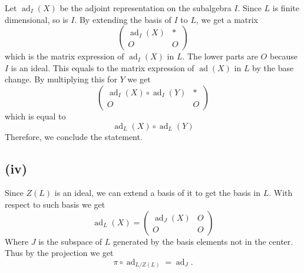 \documentclass{article}
\numberwithin{equation}{section}
\DeclareMathOperator{\ad}{ad}
\begin{document}
Let $\ad_I(X)$ be the adjoint representation on the subalgebra $I$. Since $L$ is finite dimensional, so is $I$. By extending the basis of $I$ to $L$, we get a matrix
\begin{equation*}
\begin{pmatrix}
\ad_I(X)&*\\
O&O
\end{pmatrix}
\end{equation*}
which is the matrix expression of $\ad_I(X)$ in $L$. The lower parts are $O$ because $I$ is an ideal. This equals to the matrix expression of $\ad(X)$ in $L$ by the base change. By multiplying this for $Y$ we get
\begin{equation*}
\begin{pmatrix}
\ad_I(X)\circ\ad_I(Y)&*\\
O&O
\end{pmatrix}
\end{equation*}
which is equal to 
\begin{equation*}
\ad_L(X)\circ\ad_L(Y)
\end{equation*}
Therefore, we conclude the statement.
\subsection*{(iv)}
Since $Z(L)$ is an ideal, we can extend a basis of it to get the basis in $L$. With respect to such basis we get
\begin{equation*}
\ad_L(X)=
\begin{pmatrix}
\ad_J(X)&O\\
O&O
\end{pmatrix}
\end{equation*}
Where $J$ is the subspace of $L$ generated by the basis elements not in the center. Thus by the projection we get
\begin{equation*}
\pi\circ\ad_{L/Z(L)} = \ad_J.
\end{equation*}
\end{document}

